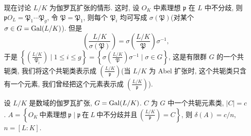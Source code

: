 现在讨论 $L/K$ 为伽罗瓦扩张的情形. 这时, 设 $O_K$ 中素理想 $\mathfrak{p}$ 在 $L$ 中不分歧, 则 $\mathfrak{p}O_L=\mathfrak{P}_1\cdots\mathfrak{P}_g$, 令 $\mathfrak{P}=\mathfrak{P}_1$, 则每个 $\mathfrak{P}_i$ 均可写成 $\sigma(\mathfrak{P})$(对某个 $\sigma\in G=\operatorname{Gal}(L/K)$). 但是
\[
  \left(\frac{L/K}{\sigma(\mathfrak{P})}\right)=\sigma\left(\frac{L/K}{\mathfrak{P}}\right)\sigma^{-1},
\]
于是 $\left\{\left(\frac{L/K}{\mathfrak{P}_i}\right)\mid 1\leqslant i\leqslant g\right\}=\left\{\sigma\left(\frac{L/K}{\mathfrak{P}}\right)\sigma^{-1}\mid\sigma\in G\right\}$, 这是有限群 $G$ 的一个共轭类, 我们将这个共轭类表示成 $\left(\frac{L/K}{\mathfrak{p}}\right)$(当 $L/K$ 为 Abel 扩张时, 这个共轭类只含有一个元素, 我们曾经把这个元素表示成 $\left(\frac{L/K}{\mathfrak{p}}\right)$). 

\begin{theorem}\label{thm:5.4}
设 $L/K$ 是数域的伽罗瓦扩张, $G=\operatorname{Gal}(L/K)$. $C$ 为 $G$ 中一个共轭元素类, $|C|=c$. $A=\left\{O_K\ \text{中素理想}\ \mathfrak{p}\mid\mathfrak{p}\ \text{在}\ L\ \text{中不分歧并且}\ \left(\frac{L/K}{\mathfrak{p}}\right)=C\right\}$, 则 $\delta(A)=c/n$, $n=[L:K]$. 
\end{theorem}


